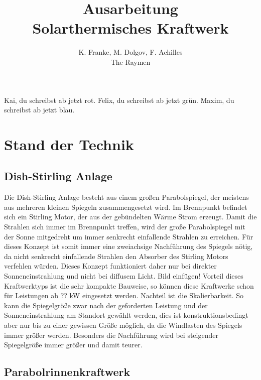 \documentclass[fontsize=10pt,paper=a4,bibliography=totoc]{scrartcl}
\title{Ausarbeitung\\Solarthermisches Kraftwerk}
\author{K. Franke, M. Dolgov, F. Achilles\\The Raymen}
\newcommand{\kai}[1]{{ \color{red} #1 }}
\newcommand{\felix}[1]{{ \color{darkgreen} #1}}
\newcommand{\maxim}[1]{{ \color{blue} #1}}
\begin{document}
\maketitle
%
\kai{Kai, du schreibst ab jetzt rot.}\newline
\felix{Felix, du schreibst ab jetzt grün.}\newline
\maxim{Maxim, du schreibst ab jetzt blau.}\newline

\section{Stand der Technik}

\subsection{Dish-Stirling Anlage}
Die Dish-Stirling Anlage besteht aus einem großen Parabolspiegel, der meistens aus mehreren kleinen Spiegeln zusammengesetzt wird. Im Brennpunkt befindet sich ein Stirling Motor, der aus der gebündelten Wärme Strom erzeugt. Damit die Strahlen sich immer im Brennpunkt treffen, wird der große Parabolspiegel mit der Sonne mitgedreht um immer senkrecht einfallende Strahlen zu erreichen. Für dieses Konzept ist somit immer eine zweiachsige Nachführung des Spiegels nötig, da nicht senkrecht einfallende Strahlen den Absorber des Stirling Motors verfehlen würden. Dieses Konzept funktioniert daher nur bei direkter Sonneneinstrahlung und nicht bei diffusem Licht. Bild einfügen! Vorteil dieses Kraftwerktyps ist die sehr kompakte Bauweise, so können diese Kraftwerke schon für Leistungen ab ??
 kW eingesetzt werden. Nachteil ist die Skalierbarkeit. So kann die Spiegelgröße zwar nach der geforderten Leistung und der Sonneneinstrahlung am Standort gewählt werden, dies ist konstruktionsbedingt aber nur bis zu einer gewissen Größe möglich, da die Windlasten des Spiegels immer größer werden. Besonders die Nachführung wird bei steigender Spiegelgröße immer größer und damit teurer.
 
\subsection{Parabolrinnenkraftwerk}
\end{document}
